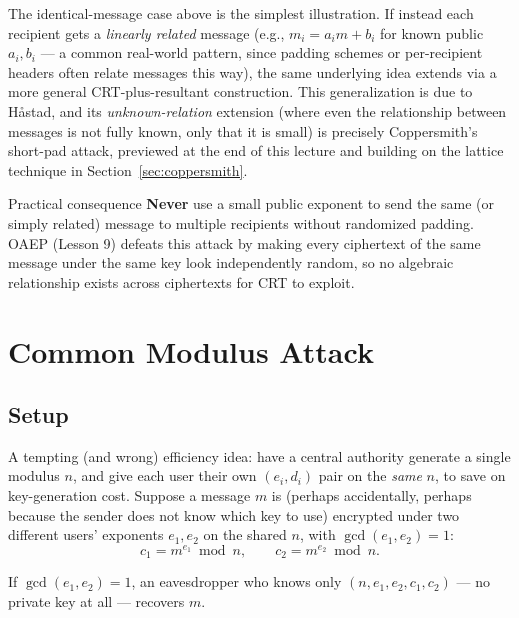 \begin{remark}
The identical-message case above is the simplest illustration. If instead each recipient gets a \emph{linearly related} message (e.g., $m_i = a_i m + b_i$ for known public $a_i,b_i$ — a common real-world pattern, since padding schemes or per-recipient headers often relate messages this way), the same underlying idea extends via a more general CRT-plus-resultant construction. This generalization is due to Håstad, and its \emph{unknown-relation} extension (where even the relationship between messages is not fully known, only that it is small) is precisely Coppersmith's short-pad attack, previewed at the end of this lecture and building on the lattice technique in Section~\ref{sec:coppersmith}.
\end{remark}

\begin{warnbox}{Practical consequence}
\textbf{Never} use a small public exponent to send the same (or simply related) message to multiple recipients without randomized padding. OAEP (Lesson 9) defeats this attack by making every ciphertext of the same message under the same key look independently random, so no algebraic relationship exists across ciphertexts for CRT to exploit.
\end{warnbox}

\newpage
\section{Common Modulus Attack}

\subsection{Setup}
A tempting (and wrong) efficiency idea: have a central authority generate a single modulus $n$, and give each user their own $(e_i, d_i)$ pair on the \emph{same} $n$, to save on key-generation cost. Suppose a message $m$ is (perhaps accidentally, perhaps because the sender does not know which key to use) encrypted under two different users' exponents $e_1, e_2$ on the shared $n$, with $\gcd(e_1,e_2)=1$:
\[
c_1 = m^{e_1} \bmod n, \qquad c_2 = m^{e_2} \bmod n.
\]

\begin{theorem}
If $\gcd(e_1,e_2)=1$, an eavesdropper who knows only $(n, e_1, e_2, c_1, c_2)$ — no private key at all — recovers $m$.
\end{theorem}

